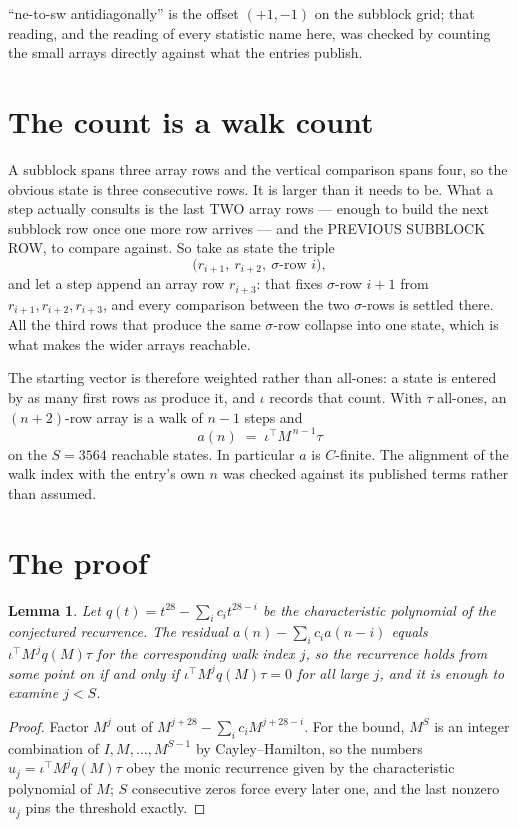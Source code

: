 \documentclass[11pt,a4paper]{article}
\theoremstyle{plain}
\newtheorem{lemma}[theorem]{Lemma}
\theoremstyle{definition}
\begin{document}
``ne-to-sw antidiagonally'' is the offset $(+1,-1)$ on the subblock grid; that reading, and
the reading of every statistic name here, was checked by counting the small arrays directly
against what the entries publish.

\section{The count is a walk count}

A subblock spans three array rows and the vertical comparison spans four, so the obvious state
is three consecutive rows. It is larger than it needs to be. What a step actually consults is
the last TWO array rows --- enough to build the next subblock row once one more row arrives ---
and the PREVIOUS SUBBLOCK ROW, to compare against. So take as state the triple
\[
\bigl(r_{i+1},\ r_{i+2},\ \sigma\text{-row }i\bigr),
\]
and let a step append an array row $r_{i+3}$: that fixes $\sigma$-row $i+1$ from
$r_{i+1},r_{i+2},r_{i+3}$, and every comparison between the two $\sigma$-rows is settled
there. All the third rows that produce the same $\sigma$-row collapse into one state, which is
what makes the wider arrays reachable.

The starting vector is therefore weighted rather than all-ones: a state is entered by as many
first rows as produce it, and $\iota$ records that count. With $\tau$ all-ones, an
$(n+2)$-row array is a walk of $n-1$ steps and
\[
a(n)\;=\;\iota^{\!\top}M^{\,n-1}\tau
\]
on the $S=3564$ reachable states. In particular $a$ is $C$-finite. The alignment of the walk
index with the entry's own $n$ was checked against its published terms rather than assumed.

\section{The proof}

\begin{lemma}\label{lem:crit}
Let $q(t)=t^{28}-\sum_i c_it^{28-i}$ be the characteristic polynomial of the
conjectured recurrence. The residual $a(n)-\sum_ic_ia(n-i)$ equals
$\iota^{\!\top}M^{\,j}q(M)\tau$ for the corresponding walk index $j$, so the recurrence
holds from some point on if and only if $\iota^{\!\top}M^{j}q(M)\tau=0$ for all large $j$,
and it is enough to examine $j<S$.
\end{lemma}

\begin{proof}
Factor $M^{j}$ out of $M^{j+28}-\sum_ic_iM^{j+28-i}$. For the bound, $M^{S}$
is an integer combination of $I,M,\dots,M^{S-1}$ by Cayley--Hamilton, so the numbers
$u_j=\iota^{\!\top}M^{j}q(M)\tau$ obey the monic recurrence given by the characteristic
polynomial of $M$; $S$ consecutive zeros force every later one, and the last nonzero $u_j$
pins the threshold exactly.
\end{proof}
\end{document}
